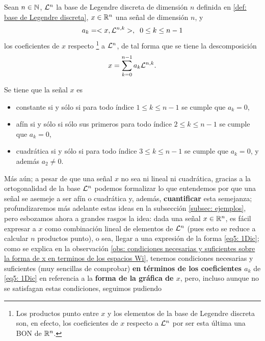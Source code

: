\begin{obs} \label{obs: condiciones necesarias y suficientes sobre la forma de x en terminos de los espacios Wi}
Sean $n \in \mathbb{N}$, $\mathcal{L}^{n}$
la base de Legendre discreta de dimensión $n$
definida en 
\ref{def: base de Legendre discreta}, 
$x \in \mathbb{R}^{n}$ una señal de dimensión $n$, y
\[
a_{k}=<x, \mathcal{L}^{n,k}>, \hspace{0.2cm} 0 \leq k \leq n-1
\]
los coeficientes de $x$
respecto
\footnote{Los productos punto entre $x$
y los elementos de la base de Legendre discreta
son, en efecto, los coeficientes de $x$
respecto a $\mathcal{L}^{n}$ por ser
esta última una BON de $\mathbb{R}^{n}$.
} a $\mathcal{L}^{n}$,
de tal forma que se tiene la descomposición
\begin{equation}
\label{eq5: 1Dic}
x=\sum\limits_{k=0}^{n-1}a_{k}\mathcal{L}^{n,k}.
\end{equation}


Se tiene que la señal $x$ es
 
\begin{itemize}
\item constante si y sólo si para todo índice
$1 \leq k \leq n-1$ se cumple que $a_{k}=0$,

\item afín si y sólo si sólo sus primeros
para todo índice
$2 \leq k \leq n-1$ se cumple que $a_{k}=0$,

\item cuadrática si y sólo si 
para todo índice
$3 \leq k \leq n-1$ se cumple que $a_{k}=0$,
y además $a_{2} \neq 0$.
\end{itemize}
\end{obs}

Más aún; a pesar de que
una señal $x$ no sea ni lineal ni cuadrática, gracias a la 
ortogonalidad de la base
$\mathcal{L}^{n}$ podemos formalizar lo que
entendemos por que una señal se asemeje a ser
afín o cuadrática y, además, \textbf{cuantificar} esta semejanza;
profundizaremos más adelante estas ideas
en la subsección \ref{subsec: ejemplos},
pero esbozamos ahora a grandes rasgos la idea:
dada una señal $x \in \mathbb{R}^{n}$, es fácil expresar
a $x$ como combinación lineal
de elementos de $\mathcal{L}^{n}$ 
(pues esto se reduce a calcular $n$ productos punto),
o sea, llegar a una expresión de la forma
\eqref{eq5: 1Dic}; como se explica en 
la observación 
\ref{obs: condiciones necesarias y suficientes sobre la forma de x en terminos de los espacios Wi}, tenemos condiciones necesarias y suficientes
(muy sencillas de comprobar)
\textbf{en términos de los coeficientes $a_{k}$}
de \eqref{eq5: 1Dic} en referencia a la \textbf{forma
de la gráfica de $x$}, pero, incluso aunque no se satisfagan
estas condiciones,
seguimos pudiendo  




